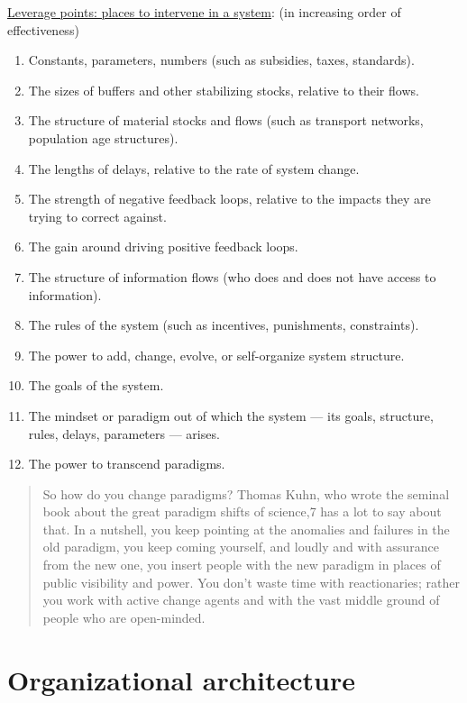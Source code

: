 \documentclass[
  letterpaper,
  DIV=11,
  numbers=noendperiod]{scrreprt}
\providecommand{\tightlist}{%
  \setlength{\itemsep}{0pt}\setlength{\parskip}{0pt}}
\begin{document}
\href{http://donellameadows.org/archives/leverage-points-places-to-intervene-in-a-system/}{Leverage
points: places to intervene in a system}: (in increasing order of
effectiveness)

\begin{enumerate}
\def\labelenumi{\arabic{enumi}.}
\setcounter{enumi}{11}
\tightlist
\item
  Constants, parameters, numbers (such as subsidies, taxes, standards).
\item
  The sizes of buffers and other stabilizing stocks, relative to their
  flows.
\item
  The structure of material stocks and flows (such as transport
  networks, population age structures).
\item
  The lengths of delays, relative to the rate of system change.
\item
  The strength of negative feedback loops, relative to the impacts they
  are trying to correct against.
\item
  The gain around driving positive feedback loops.
\item
  The structure of information flows (who does and does not have access
  to information).
\item
  The rules of the system (such as incentives, punishments,
  constraints).
\item
  The power to add, change, evolve, or self-organize system structure.
\item
  The goals of the system.
\item
  The mindset or paradigm out of which the system --- its goals,
  structure, rules, delays, parameters --- arises.
\item
  The power to transcend paradigms.
\end{enumerate}

\begin{quote}
So how do you change paradigms? Thomas Kuhn, who wrote the seminal book
about the great paradigm shifts of science,7 has a lot to say about
that. In a nutshell, you keep pointing at the anomalies and failures in
the old paradigm, you keep coming yourself, and loudly and with
assurance from the new one, you insert people with the new paradigm in
places of public visibility and power. You don't waste time with
reactionaries; rather you work with active change agents and with the
vast middle ground of people who are open-minded.
\end{quote}

\hypertarget{organizational-architecture}{%
\section{Organizational
architecture}\label{organizational-architecture}}
\end{document}
